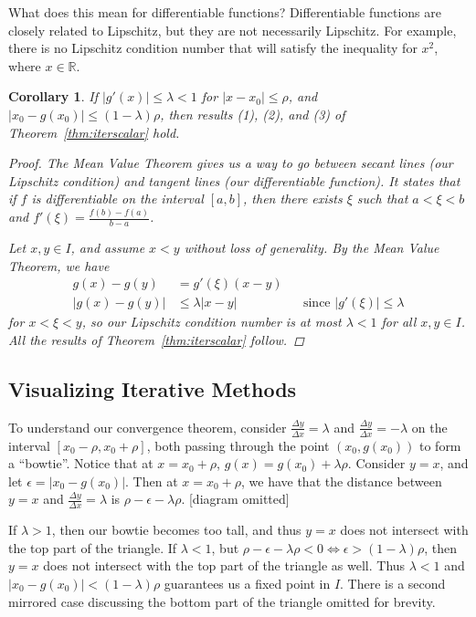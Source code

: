\documentclass[12pt,letterpaper,DIV=11]{scrartcl}
\theoremstyle{plain}
\newtheorem{corollary}{Corollary}
\theoremstyle{definition}
\theoremstyle{remark}
\begin{document}
What does this mean for differentiable functions?
Differentiable functions are closely related to Lipschitz, but they are not necessarily Lipschitz.
For example, there is no Lipschitz condition number that will satisfy the inequality for $x^2$, where $x \in \mathbb{R}$.
\begin{corollary}\label{cor:iterscalar}
  If $|g'(x)| \leq \lambda < 1$ for $|x - x_0| \leq \rho$, and $|x_0 - g(x_0)| \leq (1 - \lambda) \rho$, then results (1), (2), and (3) of Theorem~\ref{thm:iterscalar} hold.
  \begin{proof}
    The Mean Value Theorem gives us a way to go between secant lines (our Lipschitz condition) and tangent lines (our differentiable function).
    It states that if $f$ is differentiable on the interval $[a, b]$, then there exists $\xi$ such that $a < \xi < b$ and $f'(\xi) = \frac{f(b) - f(a)}{b - a}$.

    Let $x, y \in I$, and assume $x < y$ without loss of generality.
    By the Mean Value Theorem, we have \begin{align*}
      g(x) - g(y) &= g'(\xi)(x - y) \\
      |g(x) - g(y)| &\leq \lambda |x - y| && \text{since $|g'(\xi)| \leq \lambda$}
    \end{align*} for $x < \xi < y$, so our Lipschitz condition number is at most $\lambda < 1$ for all $x, y \in I$.
    All the results of Theorem~\ref{thm:iterscalar} follow.
  \end{proof}
\end{corollary}

\subsection{Visualizing Iterative Methods}
To understand our convergence theorem, consider $\frac{\Delta y}{\Delta x} = \lambda$ and $\frac{\Delta y}{\Delta x} = - \lambda$ on the interval $[x_0 - \rho, x_0 + \rho]$, both passing through the point $(x_0, g(x_0))$ to form a \enquote{bowtie}.
Notice that at $x = x_0 + \rho$, $g(x) = g(x_0) + \lambda \rho$.
Consider $y = x$, and let $\epsilon = |x_0 - g(x_0)|$.
Then at $x = x_0 + \rho$, we have that the distance between $y = x$ and $\frac{\Delta y}{\Delta x} = \lambda$ is $\rho - \epsilon - \lambda \rho$.
[diagram omitted] %

If $\lambda > 1$, then our bowtie becomes too tall, and thus $y = x$ does not intersect with the top part of the triangle.
If $\lambda < 1$, but $\rho - \epsilon - \lambda \rho < 0 \iff \epsilon > (1 - \lambda) \rho$, then $y = x$ does not intersect with the top part of the triangle as well.
  Thus $\lambda < 1$ and $|x_0 - g(x_0)| < (1 - \lambda) \rho$ guarantees us a fixed point in $I$.
  There is a second mirrored case discussing the bottom part of the triangle omitted for brevity.
\end{document}
